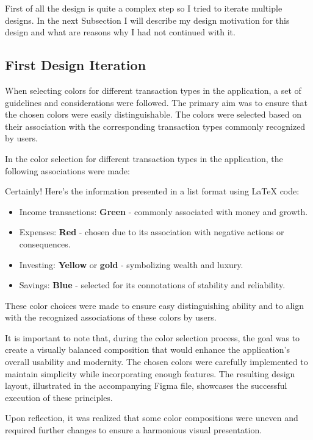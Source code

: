 \hspace{\parindent} First of all the design is quite a complex step so I tried to iterate multiple designs. 
In the next Subsection I will describe my design motivation for this design and what are reasons why I had not continued with it.

\subsection{First Design Iteration}

When selecting colors for different transaction types in the application, a set of guidelines and considerations were followed. The primary aim was to ensure that the chosen colors were easily distinguishable. The colors were selected based on their association with the corresponding transaction types commonly recognized by users.

In the color selection for different transaction types in the application, the following associations were made:

Certainly! Here's the information presented in a list format using LaTeX code:

\begin{itemize}
  \item Income transactions: \textbf{Green} - commonly associated with money and growth.
  \item Expenses: \textbf{Red} - chosen due to its association with negative actions or consequences.
  \item Investing: \textbf{Yellow} or \textbf{gold} - symbolizing wealth and luxury.
  \item Savings: \textbf{Blue} - selected for its connotations of stability and reliability.
\end{itemize}


These color choices were made to ensure easy distinguishing ability and to align with the recognized associations of these colors by users.

It is important to note that, during the color selection process, the goal was to create a visually balanced composition that would enhance the application's overall usability and modernity. The chosen colors were carefully implemented to maintain simplicity while incorporating enough features. The resulting design layout, illustrated in the accompanying Figma file, showcases the successful execution of these principles.

Upon reflection, it was realized that some color compositions were uneven and required further changes to ensure a harmonious visual presentation.

